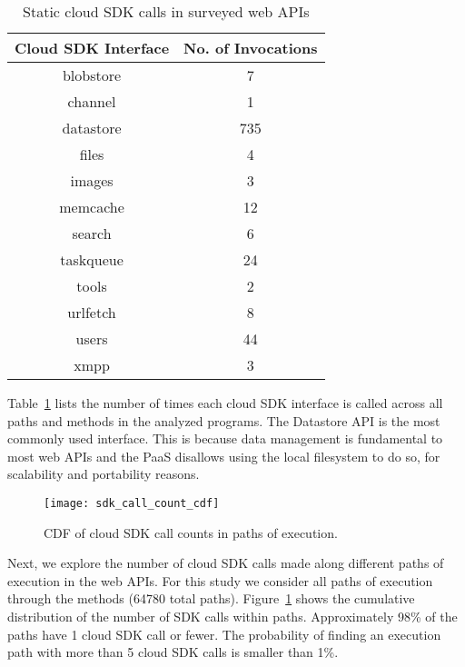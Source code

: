 \begin{table}
\caption{Static cloud SDK calls in surveyed web APIs
\label{tab:sdk_call_counts}
}
\begin{center}
\begin{tabular}{|c|c|}
\hline
Cloud SDK Interface & No. of Invocations \\ \hline
blobstore & 7 \\ \hline
channel & 1 \\ \hline
datastore & 735 \\ \hline
files & 4 \\ \hline
images & 3 \\ \hline
memcache & 12 \\ \hline
search & 6 \\ \hline
taskqueue & 24 \\ \hline
tools & 2 \\ \hline
urlfetch & 8 \\ \hline
users & 44 \\ \hline
xmpp & 3 \\ \hline
\end{tabular}
\end{center}
\vspace{-0.2in}
\end{table}

Table~\ref{tab:sdk_call_counts} lists the number of times each cloud 
SDK interface is called across all paths and methods in the analyzed programs.
The Datastore API is the most commonly used interface.
This is because data management is fundamental 
to most web APIs and the PaaS
disallows using the local filesystem to do so,
for scalability and portability reasons.

\begin{figure}
\centering
\texttt{[image: sdk\_call\_count\_cdf]}
\caption{CDF of cloud SDK call counts in paths of execution.
\label{fig:sdk_call_count_cdf}
}
\vspace{-0.1in}
\end{figure}

Next, we explore the number of cloud SDK calls made along 
different paths of execution in the web APIs. For this study
we consider all paths of execution through the methods (64780 total paths). 
Figure~\ref{fig:sdk_call_count_cdf}
shows the cumulative distribution of the number of SDK calls within paths.
Approximately 98\% of the paths have 1 cloud SDK call or fewer. 
The probability of finding an execution path with more than
5 cloud SDK calls is smaller than 1\%.

